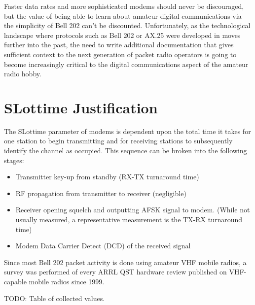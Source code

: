\documentclass[12pt,letterpaper]{article}
\begin{document}
Faster data rates and more sophisticated modems should never be discouraged,
but the value of being able to learn about amateur digital communications 
via the simplicity of Bell 202 can't be discounted.
Unfortunately, as the technological landscape where 
protocols such as Bell 202 or AX.25 were developed in moves further into the past,
the need to write additional documentation that gives sufficient context to 
the next generation of packet radio operators is going to become increasingly 
critical to the digital communications aspect of the amateur radio hobby.


\appendix
\section{SLottime Justification}
\label{vhftxrx}

The SLottime parameter of modems is dependent upon the total time
it takes for one station to begin transmitting and for receiving stations
to subsequently identify the channel as occupied.
This sequence can be broken into the following stages:
\begin{itemize}
	\item Transmitter key-up from standby (RX-TX turnaround time)
	\item RF propagation from transmitter to receiver (negligible)
	\item Receiver opening squelch and outputting AFSK signal to modem. 
		(While not usually measured, a representative measurement is
		the TX-RX turnaround time)
	\item Modem Data Carrier Detect (DCD) of the received signal
\end{itemize}

Since most Bell 202 packet activity is done using amateur VHF mobile radios,
a survey was performed of every ARRL QST hardware review published on VHF-capable
mobile radios since 1999.

TODO: Table of collected values.
\end{document}
